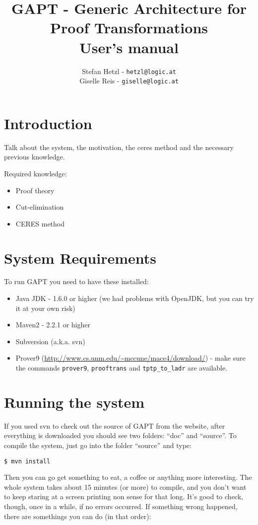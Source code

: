 \documentclass[a4paper, 11pt]{report}
\title{GAPT - Generic Architecture for Proof Transformations \\ \vspace{0.5cm} User's manual}
\author{
Stefan Hetzl - \texttt{hetzl@logic.at}\\
Giselle Reis - \texttt{giselle@logic.at}
}
\begin{document}
\maketitle

\section{Introduction}

Talk about the system, the motivation, the ceres method and the necessary
previous knowledge.

Required knowledge:
\begin{itemize}
  \item Proof theory
  \item Cut-elimination
  \item CERES method
\end{itemize}

\section{System Requirements}
\label{sec:sysreq}

To run GAPT you need to have these installed:

\begin{itemize}
\item Java JDK - 1.6.0 or higher (we had problems with OpenJDK, but you can try
it at your own risk)
\item Maven2 - 2.2.1 or higher
\item Subversion (a.k.a. svn)
\item Prover9 (\url{http://www.cs.unm.edu/~mccune/mace4/download/}) - make sure
the commands \texttt{prover9}, \texttt{prooftrans} and \texttt{tptp\_to\_ladr}
are available.
\end{itemize}

\section{Running the system}

If you used svn to check out the source of GAPT from the website, after
everything is downloaded you should see two folders: ``doc'' and ``source''. To
compile the system, just go into the folder ``source'' and type:

\begin{lstlisting}
$ mvn install
\end{lstlisting}

Then you can go get something to eat, a coffee or anything more interesting. The
whole system takes about 15 minutes (or more) to compile, and you don't want to keep
staring at a screen printing non sense for that long. It's good to check,
though, once in a while, if no errors occurred. If something wrong happened,
there are somethings you can do (in that order):
\end{document}

